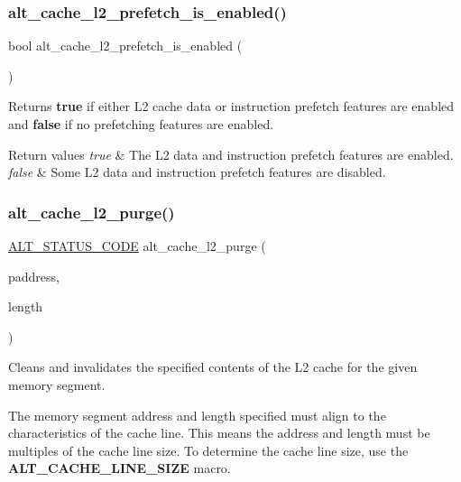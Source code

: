 \subsubsection{\texorpdfstring{alt\_cache\_l2\_prefetch\_is\_enabled()}{alt\_cache\_l2\_prefetch\_is\_enabled()}}
{\footnotesize\ttfamily bool alt\+\_\+cache\+\_\+l2\+\_\+prefetch\+\_\+is\+\_\+enabled (\begin{DoxyParamCaption}\item[{void}]{ }\end{DoxyParamCaption})}

Returns {\bfseries{true}} if either L2 cache data or instruction prefetch features are enabled and {\bfseries{false}} if no prefetching features are enabled.


\begin{DoxyRetVals}{Return values}
{\em true} & The L2 data and instruction prefetch features are enabled. \\
\hline
{\em false} & Some L2 data and instruction prefetch features are disabled. \\
\hline
\end{DoxyRetVals}
\mbox{\label{group__CACHE__L2_ga4dbc7de380de66569cf924bf09a14cf6}} 
\subsubsection{\texorpdfstring{alt\_cache\_l2\_purge()}{alt\_cache\_l2\_purge()}}
{\footnotesize\ttfamily \mbox{\hyperlink{hwlib_8h_abdb0d369f069723ca55d6c94bcaaaa12}{A\+L\+T\+\_\+\+S\+T\+A\+T\+U\+S\+\_\+\+C\+O\+DE}} alt\+\_\+cache\+\_\+l2\+\_\+purge (\begin{DoxyParamCaption}\item[{void $\ast$}]{paddress,  }\item[{size\+\_\+t}]{length }\end{DoxyParamCaption})}

Cleans and invalidates the specified contents of the L2 cache for the given memory segment.

The memory segment address and length specified must align to the characteristics of the cache line. This means the address and length must be multiples of the cache line size. To determine the cache line size, use the {\bfseries{A\+L\+T\+\_\+\+C\+A\+C\+H\+E\+\_\+\+L\+I\+N\+E\+\_\+\+S\+I\+ZE}} macro.


